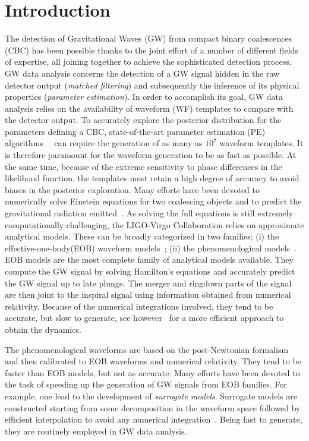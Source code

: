 
\section{Introduction}
The detection of Gravitational Waves (GW) from compact binary coalescences (CBC) has been possible thanks to the joint effort of a number of different fields of expertise, all joining together to achieve the sophisticated detection process. GW data analysis concerns the detection of a GW signal hidden in the raw detector output (\textit{matched filtering}) and subsequently the inference of its physical properties (\textit{parameter estimation}). In order to accomplish its goal, GW data analysis relies on the availability of waveform (WF) templates to compare with the detector output.
To accurately explore the posterior distribution for the parameters defining a CBC, state-of-the-art parameter estimation (PE) algorithms~\cite{Aasi:2013jjl}~\cite{Veitch2014wba} can require the generation of as many as $10^7$ waveform templates. It is therefore paramount for the waveform generation to be as fast as possible. At the same time, because of the extreme sensitivity to phase differences in the likelihood  function, 
the templates must retain a high degree of accuracy to avoid biases in the posterior exploration.
Many efforts have been devoted to numerically solve Einstein equations for two coalescing objects and 
to predict the gravitational radiation emitted~\cite{}.
As solving the full equations is still extremely computationally challenging, the LIGO-Virgo Collaboration relies on approximate analytical models. 
These can be broadly categorized in  two families; (i) the effective-one-body(EOB) waveform 
models~\cite{Damour:2009kr,Chiaramello:2020ehz}; (ii) the phenomenological 
models~\cite{Khan:2015jqa,Pratten:2020ceb,Estelles:2020osj}.
%
%
EOB models are the most complete family 
of analytical models available. They compute the GW signal by solving Hamilton's equations 
and accurately predict the GW signal up to late plunge. The merger and ringdown  parts of 
the signal are then joint to the inspiral signal using information obtained from numerical relativity. 
Because of the numerical integrations involved, they tend to be accurate, but slow to generate, 
see however~\cite{Nagar:2018gnk} for a more efficient approach to obtain the dynamics.

The phenomenological waveforms are based on the post-Newtonian formalism and then calibrated 
to  EOB waveforms and numerical relativity. They tend to be faster than EOB models, but not as accurate.
Many efforts have been devoted to the task of speeding up the generation of GW signals from 
EOB families. For example, one lead to the development of \textit{surrogate models}. Surrogate 
models are constructed starting from some decomposition in the waveform space followed by efficient 
interpolation to avoid any  numerical integration~\cite{Purrer:2015tud,Bohe:2016gbl,Purrer:2017str,Lackey:2018zvw,Cotesta:2020qhw}. 
Being fast to generate, they are routinely employed in GW data analysis. 

